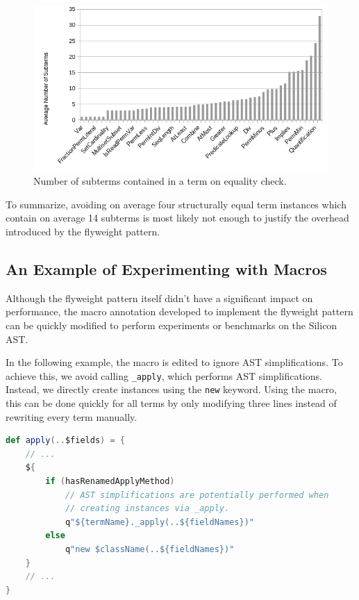 \documentclass[11pt]{article}
\begin{document}
    \begin{figure}[H]
        \includegraphics[width=\linewidth]{node-count.png}
        \caption{Number of subterms contained in a term on equality check.}
        \label{fig:node-count}
    \end{figure}

    To summarize, avoiding on average four structurally equal term instances which contain
    on average 14 subterms is most likely not enough to justify the overhead introduced by the flyweight pattern.



    \subsection{An Example of Experimenting with Macros}

    Although the flyweight pattern itself didn't have a significant impact on performance,
    the macro annotation developed to implement the flyweight pattern can
    be quickly modified to perform experiments or benchmarks on the Silicon AST.

    In the following example, the macro is edited to ignore AST simplifications.
    To achieve this, we avoid calling \texttt{\_apply}, which performs AST simplifications.
    Instead, we directly create instances using the \texttt{new} keyword.
    Using the macro, this can be done quickly for all terms by only modifying three lines
    instead of rewriting every term manually.

    \begin{lstlisting}[language=Scala, caption=Use AST simplifications as normal.]
def apply(..$fields) = {
    // ...
    ${
        if (hasRenamedApplyMethod)
            // AST simplifications are potentially performed when
            // creating instances via _apply.
            q"${termName}._apply(..${fieldNames})"
        else
            q"new $className(..${fieldNames})"
    }
    // ...
}  
    \end{lstlisting}
\end{document}
